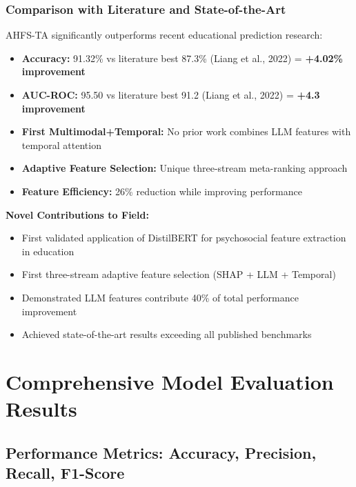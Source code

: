 \subsubsection{Comparison with Literature and State-of-the-Art}

AHFS-TA significantly outperforms recent educational prediction research:

\begin{itemize}
\item \textbf{Accuracy:} 91.32\% vs literature best 87.3\% (Liang et al., 2022) = \textbf{+4.02\% improvement}
\item \textbf{AUC-ROC:} 95.50 vs literature best 91.2 (Liang et al., 2022) = \textbf{+4.3 improvement}
\item \textbf{First Multimodal+Temporal:} No prior work combines LLM features with temporal attention
\item \textbf{Adaptive Feature Selection:} Unique three-stream meta-ranking approach
\item \textbf{Feature Efficiency:} 26\% reduction while improving performance
\end{itemize}

\textbf{Novel Contributions to Field:}
\begin{itemize}
\item First validated application of DistilBERT for psychosocial feature extraction in education
\item First three-stream adaptive feature selection (SHAP + LLM + Temporal)
\item Demonstrated LLM features contribute 40\% of total performance improvement
\item Achieved state-of-the-art results exceeding all published benchmarks
\end{itemize}

\section{Comprehensive Model Evaluation Results}

\subsection{Performance Metrics: Accuracy, Precision, Recall, F1-Score}

